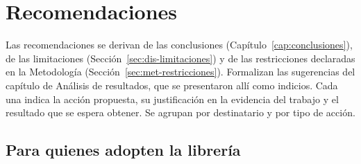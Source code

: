 \ifdefined\modoensamble
\else
	
\fi

\chapter{Recomendaciones}
\label{cap:recomendaciones}

Las recomendaciones se derivan de las conclusiones (Capítulo~\ref{cap:conclusiones}), de las
limitaciones (Sección~\ref{sec:dis-limitaciones}) y de las restricciones declaradas en la
Metodología (Sección~\ref{sec:met-restricciones}). Formalizan las sugerencias del capítulo de
Análisis de resultados, que se presentaron allí como indicios. Cada una indica la acción propuesta,
su justificación en la evidencia del trabajo y el resultado que se espera obtener. Se agrupan por
destinatario y por tipo de acción.

\section{Para quienes adopten la librería}

